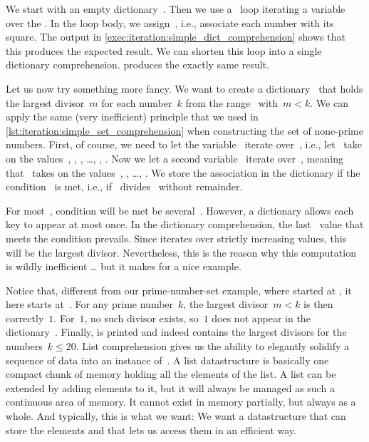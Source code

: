 We start with an empty dictionary~.
Then we use a ~loop iterating a variable~ over the .
In the loop body, we assign~, i.e., associate each number with its square.
The output in \cref{exec:iteration:simple_dict_comprehension} shows that this produces the expected result.
We can shorten this loop into a single dictionary comprehension.
 produces the exactly same result.

Let us now try something more fancy.
We want to create a dictionary~ that holds the largest divisor~$m$ for each number~$k$ from the range~ with~$m<k$.
We can apply the same (very inefficient) principle that we used in \cref{lst:iteration:simple_set_comprehension} when constructing the set of none-prime numbers.
First, of course, we need to let the variable~ iterate over~, i.e., let~ take on the values~, , , \dots, , .
Now we let a second variable~ iterate over~, meaning that~ takes on the values~, , \dots, .
We store the association  in the dictionary if the condition~ is met, i.e., if~ divides~ without remainder.

For most~, condition will be met be several~.
However, a dictionary allows each key to appear at most once.
In the dictionary comprehension, the last~ value that meets the condition prevails.
Since  iterates over strictly increasing values, this will be the largest divisor.
Nevertheless, this is the reason why this computation is wildly inefficient {\dots} but it makes for a nice example.

Notice that, different from our prime-number-set example, where  started at , it here  starts at~.
For any prime number~$k$, the largest divisor~$m<k$ is then correctly~$1$.
For~$1$, no such divisor exists, so~$1$ does not appear in the dictionary~.
Finally,  is printed and indeed contains the largest divisors for the numbers~$k\leq20$.%
%
\FloatBarrier%
\endhsection%
%
%
\label{sec:generatorExpressions}%
%
List comprehension gives us the ability to elegantly solidify a sequence of data into an instance of~.
A list datastructure is basically one compact chunk of memory holding all the elements of the list.
A list can be extended by adding elements to it, but it will always be managed as such a continuous area of memory.
It cannot exist in memory partially, but always as a whole.
And typically, this is what we want:
We want a datastructure that can store the elements and that lets us access them in an efficient way.

